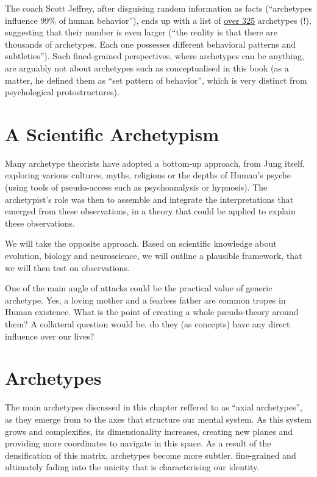 \documentclass[]{book}
\begin{document}
The coach Scott Jeffrey, after disguising random information as facts (``archetypes influence 99\% of human behavior''), ends up with a list of \href{https://scottjeffrey.com/archetypes-list/}{over 325} archetypes (!), suggesting that their number is even larger (``the reality is that there are thousands of archetypes. Each one possesses different behavioral patterns and subtleties''). Such fined-grained perspectives, where archetypes can be anything, are arguably not about archetypes such as conceptualised in this book (as a matter, he defined them as ``set pattern of behavior'', which is very distinct from psychological protostructures).

\hypertarget{a-scientific-archetypism}{%
\chapter{A Scientific Archetypism}\label{a-scientific-archetypism}}

Many archetype theorists have adopted a bottom-up approach, from Jung itself, exploring various cultures, myths, religions or the depths of Human's psyche (using tools of pseudo-access such as psychoanalysis or hypnosis). The archetypist's role was then to assemble and integrate the interpretations that emerged from these observations, in a theory that could be applied to explain these observations.

We will take the opposite approach. Based on scientific knowledge about evolution, biology and neuroscience, we will outline a plausible framework, that we will then test on observations.

One of the main angle of attacks could be the practical value of generic archetype. Yes, a loving mother and a fearless father are common tropes in Human existence. What is the point of creating a whole pseudo-theory around them? A collateral question would be, do they (as concepts) have any direct influence over our lives?

\hypertarget{archetypes}{%
\chapter{Archetypes}\label{archetypes}}

The main archetypes discussed in this chapter reffered to as ``axial archetypes'', as they emerge from to the axes that structure our mental system. As this system grows and complexifies, its dimensionality increases, creating new planes and providing more coordinates to navigate in this space. As a result of the densification of this matrix, archetypes become more subtler, fine-grained and ultimately fading into the unicity that is characterising our identity.
\end{document}
